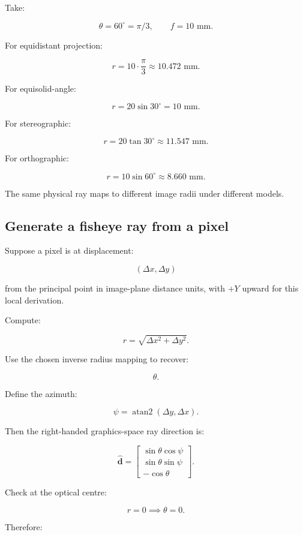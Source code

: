 Take:

\[ \theta=60^\circ=\pi/3, \qquad f=10\text{ mm}. \]

For equidistant projection:

\[ r=10\cdot\frac\pi3 \approx\boxed{10.472\text{ mm}}. \]

For equisolid-angle:

\[ r=20\sin30^\circ =\boxed{10\text{ mm}}. \]

For stereographic:

\[ r=20\tan30^\circ \approx\boxed{11.547\text{ mm}}. \]

For orthographic:

\[ r=10\sin60^\circ \approx\boxed{8.660\text{ mm}}. \]

The same physical ray maps to different image radii under different models.

\subsection{Generate a fisheye ray from a pixel}\label{02-foundations-ii-ch035-generate-a-fisheye-ray-from-a-pixel}

\hypertarget{02-foundations-ii-ch035-generate-a-fisheye-ray-from-a-pixel}{}

Suppose a pixel is at displacement:

\[ (\Delta x,\Delta y) \]

from the principal point in image-plane distance units, with \(+Y\) upward for this local derivation.

Compute:

\[ r=\sqrt{\Delta x^2+\Delta y^2}. \]

Use the chosen inverse radius mapping to recover:

\[ \theta. \]

Define the azimuth:

\[ \psi=\operatorname{atan2}(\Delta y,\Delta x). \]

Then the right-handed graphics-space ray direction is:

\[ \boxed{ \hat{\mathbf d}= \begin{bmatrix} \sin\theta\cos\psi\\ \sin\theta\sin\psi\\ -\cos\theta \end{bmatrix}. } \]

Check at the optical centre:

\[ r=0\implies\theta=0. \]

Therefore:

